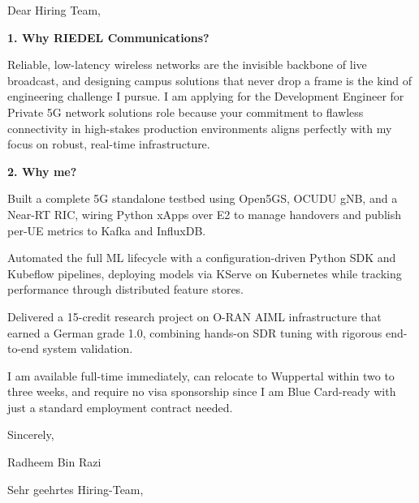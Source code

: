 \documentclass[11pt,a4paper]{coverletter}
\begin{document}

\opening{Dear Hiring Team,}

\vspace{8pt}\noindent\textbf{1. Why RIEDEL Communications?}\par\vspace{3pt}

Reliable, low-latency wireless networks are the invisible backbone of live broadcast, and designing campus solutions that never drop a frame is the kind of engineering challenge I pursue. I am applying for the Development Engineer for Private 5G network solutions role because your commitment to flawless connectivity in high-stakes production environments aligns perfectly with my focus on robust, real-time infrastructure.

\vspace{8pt}\noindent\textbf{2. Why me?}\par\vspace{3pt}

\bullets

  \item Built a complete 5G standalone testbed using Open5GS, OCUDU gNB, and a Near-RT RIC, wiring Python xApps over E2 to manage handovers and publish per-UE metrics to Kafka and InfluxDB.

  \item Automated the full ML lifecycle with a configuration-driven Python SDK and Kubeflow pipelines, deploying models via KServe on Kubernetes while tracking performance through distributed feature stores.

  \item Delivered a 15-credit research project on O-RAN AIML infrastructure that earned a German grade 1.0, combining hands-on SDR tuning with rigorous end-to-end system validation.

\bulletsend

I am available full-time immediately, can relocate to Wuppertal within two to three weeks, and require no visa sponsorship since I am Blue Card-ready with just a standard employment contract needed.

\closing{Sincerely,}{Radheem Bin Razi}

\clearpage
{}


\opening{Sehr geehrtes Hiring-Team,}
\end{document}
